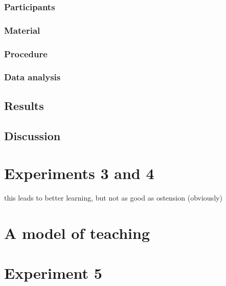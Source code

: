 \documentclass[english,,man,floatsintext]{apa6}
\begin{document}
\hypertarget{participants}{%
\subsubsection{Participants}\label{participants}}

\hypertarget{material}{%
\subsubsection{Material}\label{material}}

\hypertarget{procedure}{%
\subsubsection{Procedure}\label{procedure}}

\hypertarget{data-analysis}{%
\subsubsection{Data analysis}\label{data-analysis}}

\hypertarget{results}{%
\subsection{Results}\label{results}}

\hypertarget{discussion}{%
\subsection{Discussion}\label{discussion}}

\hypertarget{experiments-3-and-4}{%
\section{Experiments 3 and 4}\label{experiments-3-and-4}}

this leads to better learning, but not as good as ostension (obviously)

\hypertarget{a-model-of-teaching}{%
\section{A model of teaching}\label{a-model-of-teaching}}

\hypertarget{experiment-5}{%
\section{Experiment 5}\label{experiment-5}}
\end{document}
